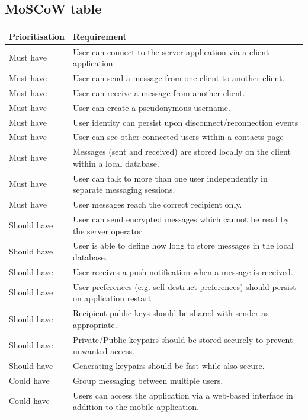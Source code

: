 \documentclass{mproj}
\begin{document}
\subsection{MoSCoW table}
\begin{longtable}{|p{2.5cm}|p{11cm}|}
	\hline
	Prioritisation & Requirement\\
	\hline
	Must have & User can connect to the server application via a client application.\\
	\hline
	Must have & User can send a message from one client to another client.\\
	\hline
	Must have & User can receive a message from another client.\\
	\hline
	Must have & User can create a pseudonymous username.\\
	\hline
	Must have & User identity can persist upon disconnect/reconnection events\\
	\hline
	Must have & User can see other connected users within a contacts page\\
	\hline
	Must have & Messages (sent and received) are stored locally on the client within a local database.\\
	\hline
	Must have & User can talk to more than one user independently in separate messaging sessions.\\
	\hline
	Must have & User messages reach the correct recipient only.\\
	\hline
	Should have & User can send encrypted messages which cannot be read by the server operator.\\
	\hline
	Should have & User is able to define how long to store messages in the local database.\\
	\hline
	Should have & User receives a push notification when a message is received.\\
	\hline
	Should have & User preferences (e.g. self-destruct preferences) should persist on application restart \\
	\hline
	Should have & Recipient public keys should be shared with sender as appropriate.\\
	\hline
	Should have & Private/Public keypairs should be stored securely to prevent unwanted access.\\
	\hline
	Should have & Generating keypairs should be fast while also secure.\\
	\hline
	Could have & Group messaging between multiple users.\\
	\hline
	Could have & Users can access the application via a web-based interface in addition to the mobile application.\\

\end{longtable}
\end{document}
